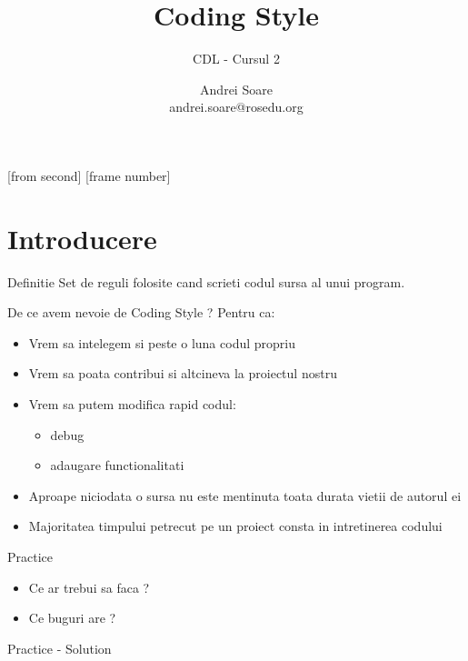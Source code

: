 \documentclass{beamer}
\title[Coding Style]{Coding Style}
\subtitle{CDL - Cursul 2}
\institute{ROSEdu}
\author{Andrei Soare \\ {\footnotesize andrei.soare@rosedu.org}}
\begin{document}
[from second]
[frame number]

\frame{\titlepage}

\frame{\tableofcontents}


\section{Introducere}

  \frame{\tableofcontents[currentsection]}

  \begin{frame}{Definitie}
  Set de reguli folosite cand scrieti codul sursa al unui program.
  \end{frame}
 
  \begin{frame}{De ce avem nevoie de Coding Style ?}
  Pentru ca:\\
  \vspace{0.8cm}
  \begin{itemize}
  \setlength{\itemsep}{0.3cm}
  \pause \item Vrem sa intelegem si peste o luna codul propriu
  \item Vrem sa poata contribui si altcineva la proiectul nostru
  \item Vrem sa putem modifica rapid codul:\begin{itemize} \item debug \item adaugare functionalitati \end{itemize}
  \item Aproape niciodata o sursa nu este mentinuta toata durata vietii de autorul ei
  \item Majoritatea timpului petrecut pe un proiect consta in intretinerea codului
  \end{itemize}
  \end{frame}

  \begin{frame}{Practice}
  
  \begin{itemize}
  \item Ce ar trebui sa faca ?
  \item Ce buguri are ?
  \end{itemize}
  \end{frame}

  \begin{frame}{Practice - Solution}
  
  \end{frame}
\end{document}
